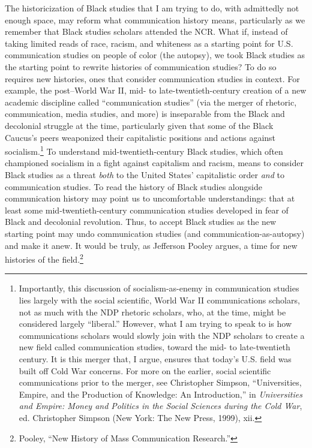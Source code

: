\documentclass{tufte-handout}
\begin{document}
The historicization of Black studies that I am trying to do, with
admittedly not enough space, may reform what communication history
means, particularly as we remember that Black studies scholars attended
the NCR. What if, instead of taking limited reads of race, racism, and
whiteness as a starting point for U.S. communication studies on people
of color (the autopsy), we took Black studies as the starting point to
rewrite histories of communication studies? To do so requires new
histories, ones that consider communication studies in context. For
example, the post--World War II, mid- to late-twentieth-century creation
of a new academic discipline called ``communication studies'' (via the
merger of rhetoric, communication, media studies, and more) is
inseparable from the Black and decolonial struggle at the time,
particularly given that some of the Black Caucus's peers weaponized
their capitalistic positions and actions against
socialism.\footnote{Importantly, this discussion of socialism-as-enemy in communication
  studies lies largely with the social scientific, World War II
  communications scholars, not as much with the NDP rhetoric scholars,
  who, at the time, might be considered largely ``liberal.'' However,
  what I am trying to speak to is how communications scholars would
  slowly join with the NDP scholars to create a new field called
  communication studies, toward the mid- to late-twentieth century. It
  is this merger that, I argue, ensures that today's U.S. field was
  built off Cold War concerns. For more on the earlier, social
  scientific communications prior to the merger, see Christopher
  Simpson, ``Universities, Empire, and the Production of Knowledge: An
  Introduction,'' in \emph{Universities and Empire: Money and Politics
  in the Social Sciences during the Cold War}, ed. Christopher Simpson
  (New York: The New Press, 1999), xii.
} To understand
mid-twentieth-century Black studies, which often championed socialism in
a fight against capitalism and racism, means to consider Black studies
as a threat \emph{both} to the United States' capitalistic order
\emph{and} to communication studies. To read the history of Black
studies alongside communication history may point us to uncomfortable
understandings: that at least some mid-twentieth-century communication
studies developed in fear of Black and decolonial revolution. Thus, to
accept Black studies as the new starting point may undo communication
studies (and communication-as-autopsy) and make it anew. It would be
truly, as Jefferson Pooley argues, a time for new histories of the
field.\footnote{ Pooley, ``New History of Mass Communication Research.''}
\end{document}
